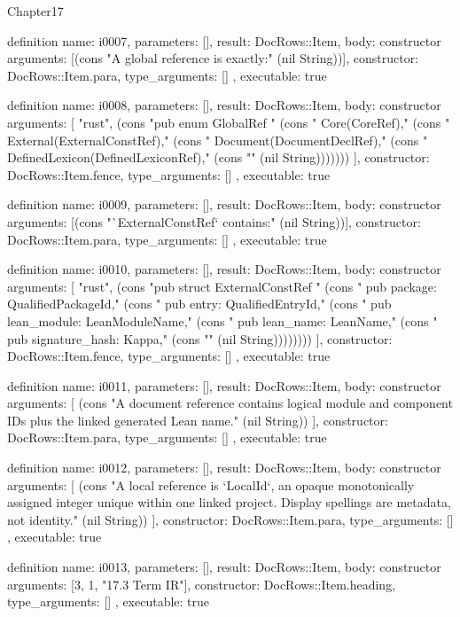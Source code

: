 \begin{lexlean}{Chapter17}
\begin{semanticmodule}
definition{
  name: i0007,
  parameters: [],
  result: DocRows::Item,
  body: constructor{
    arguments: [(cons "A global reference is exactly:" (nil String))],
    constructor: DocRows::Item.para,
    type_arguments: []
  },
  executable: true
}

definition{
  name: i0008,
  parameters: [],
  result: DocRows::Item,
  body: constructor{
    arguments: [
      "rust",
      (cons "pub enum GlobalRef {" (cons "    Core(CoreRef)," (cons "    External(ExternalConstRef)," (cons "    Document(DocumentDeclRef)," (cons "    DefinedLexicon(DefinedLexiconRef)," (cons "}" (nil String)))))))
    ],
    constructor: DocRows::Item.fence,
    type_arguments: []
  },
  executable: true
}

definition{
  name: i0009,
  parameters: [],
  result: DocRows::Item,
  body: constructor{
    arguments: [(cons "`ExternalConstRef` contains:" (nil String))],
    constructor: DocRows::Item.para,
    type_arguments: []
  },
  executable: true
}

definition{
  name: i0010,
  parameters: [],
  result: DocRows::Item,
  body: constructor{
    arguments: [
      "rust",
      (cons "pub struct ExternalConstRef {" (cons "    pub package: QualifiedPackageId," (cons "    pub entry: QualifiedEntryId," (cons "    pub lean_module: LeanModuleName," (cons "    pub lean_name: LeanName," (cons "    pub signature_hash: Kappa," (cons "}" (nil String))))))))
    ],
    constructor: DocRows::Item.fence,
    type_arguments: []
  },
  executable: true
}

definition{
  name: i0011,
  parameters: [],
  result: DocRows::Item,
  body: constructor{
    arguments: [
      (cons "A document reference contains logical module and component IDs plus the linked generated Lean name." (nil String))
    ],
    constructor: DocRows::Item.para,
    type_arguments: []
  },
  executable: true
}

definition{
  name: i0012,
  parameters: [],
  result: DocRows::Item,
  body: constructor{
    arguments: [
      (cons "A local reference is `LocalId`, an opaque monotonically assigned integer unique within one linked project. Display spellings are metadata, not identity." (nil String))
    ],
    constructor: DocRows::Item.para,
    type_arguments: []
  },
  executable: true
}

definition{
  name: i0013,
  parameters: [],
  result: DocRows::Item,
  body: constructor{
    arguments: [3, 1, "17.3 Term IR"],
    constructor: DocRows::Item.heading,
    type_arguments: []
  },
  executable: true
}


\end{semanticmodule}
\end{lexlean}
